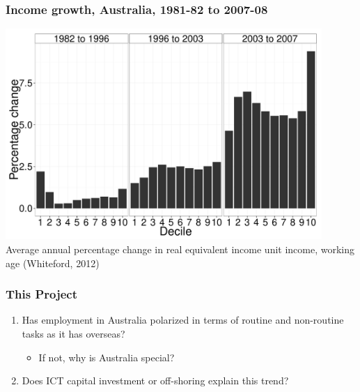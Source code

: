 \documentclass[red]{beamer}
\begin{document}
\begin{frame}
  \frametitle{Income growth, Australia, 1981-82 to 2007-08}
  \begin{center}
  \includegraphics[width=0.9\textwidth]{slides/figure_wage_deciles.pdf} \\
  Average annual percentage change in real equivalent income unit income, working age (Whiteford, 2012)
  \end{center}
\end{frame}

\begin{frame}
  \frametitle{This Project}
  \begin{enumerate}
  \item  Has employment in Australia polarized in terms of routine and non-routine tasks as it has overseas?
    \begin{itemize}
    \item If not, why is Australia special?
    \end{itemize}
  \item Does ICT capital investment or off-shoring explain this trend?
  \end{enumerate}
\end{frame}
\end{document}
